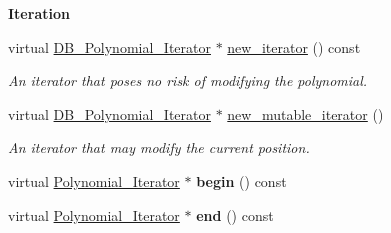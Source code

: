 \begin{Indent}\textbf{ Iteration}\par
\begin{DoxyCompactItemize}
\item 
\mbox{\label{class_double___buffered___polynomial_aa4b7feead6f82b144851a5d1828b2cb1}} 
virtual \hyperlink{class_d_b___polynomial___iterator}{D\+B\+\_\+\+Polynomial\+\_\+\+Iterator} $\ast$ \hyperlink{class_double___buffered___polynomial_aa4b7feead6f82b144851a5d1828b2cb1}{new\+\_\+iterator} () const
\begin{DoxyCompactList}\small\item\em An iterator that poses no risk of modifying the polynomial. \end{DoxyCompactList}\item 
\mbox{\label{class_double___buffered___polynomial_ac85f3899da0c62afdfa8ace3a65e7704}} 
virtual \hyperlink{class_d_b___polynomial___iterator}{D\+B\+\_\+\+Polynomial\+\_\+\+Iterator} $\ast$ \hyperlink{class_double___buffered___polynomial_ac85f3899da0c62afdfa8ace3a65e7704}{new\+\_\+mutable\+\_\+iterator} ()
\begin{DoxyCompactList}\small\item\em An iterator that may modify the current position. \end{DoxyCompactList}\item 
\mbox{\label{class_double___buffered___polynomial_a2be8752fc15c2f55aa64eb8a94f66807}} 
virtual \hyperlink{class_polynomial___iterator}{Polynomial\+\_\+\+Iterator} $\ast$ {\bfseries begin} () const
\item 
\mbox{\label{class_double___buffered___polynomial_ae5463da4bd4c8a68e93deedb0ed1b2e3}} 
virtual \hyperlink{class_polynomial___iterator}{Polynomial\+\_\+\+Iterator} $\ast$ {\bfseries end} () const
\end{DoxyCompactItemize}
\end{Indent}
